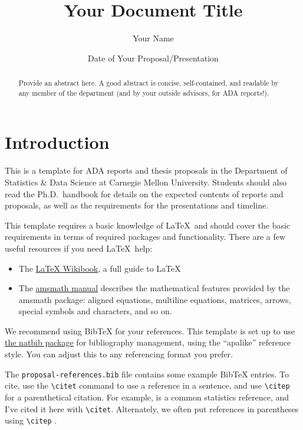 \documentclass[draft]{cmustatproposal} %
\title{Your Document Title}
\author{Your Name}
\date{Date of Your Proposal/Presentation}
\begin{document}
\maketitle

\begin{abstract}
  Provide an abstract here. A good abstract is concise, self-contained, and
  readable by any member of the department (and by your outside advisors, for
  ADA reports!).
\end{abstract}

\section{Introduction}

This is a template for ADA reports and thesis proposals in the Department of
Statistics \& Data Science at Carnegie Mellon University. Students should also
read the Ph.D.\ handbook for details on the expected contents of reports and
proposals, as well as the requirements for the presentations and timeline.

This template requires a basic knowledge of \LaTeX\ and should cover the basic
requirements in terms of required packages and functionality. There are a few
useful resources if you need \LaTeX\ help:
\begin{itemize}
\item The \href{https://en.wikibooks.org/wiki/LaTeX}{LaTeX Wikibook}, a full
  guide to \LaTeX
\item The
  \href{http://mirrors.ctan.org/macros/latex/required/amsmath/amsldoc.pdf}{amsmath
    manual} describes the mathematical features provided by the amsmath package:
  aligned equations, multiline equations, matrices, arrows, special symbols and
  characters, and so on.
\end{itemize}

We recommend using BibTeX for your references. This template is set up to use
\href{http://mirrors.ctan.org/macros/latex/contrib/natbib/natbib.pdf}{the natbib
  package} for bibliography management, using the ``apalike'' reference style.
You can adjust this to any referencing format you prefer.

The \texttt{proposal-references.bib} file contains some example BibTeX entries.
To cite, use the \verb|\citet| command to use a reference in a sentence, and use
\verb|\citep| for a parenthetical citation. For example, \citet{Wasserman:2004}
is a common statistics reference, and I've cited it here with \verb|\citet|.
Alternately, we often put references in parentheses using \verb|\citep|
\citep{Underhill:1999}.
\end{document}
